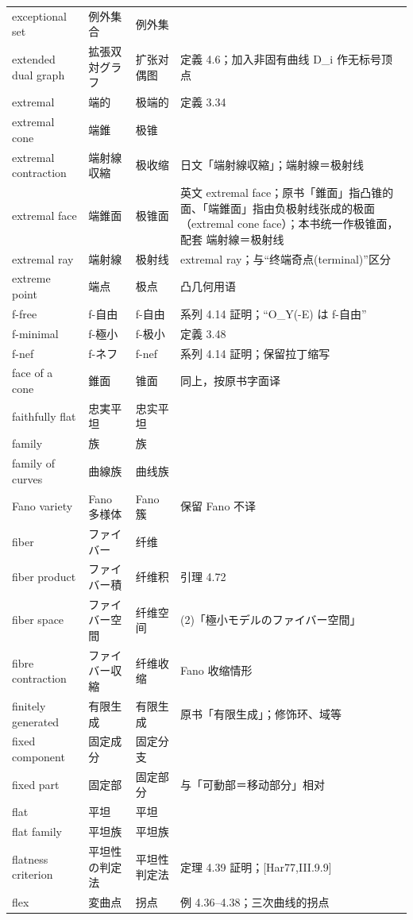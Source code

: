 \begin{longtable}{@{}>{\raggedright\arraybackslash}p{}>{\raggedright\arraybackslash}p{}>{\raggedright\arraybackslash}p{}>{\raggedright\arraybackslash}p{}@{}}
exceptional set & 例外集合 & 例外集 &  \\
extended dual graph & 拡張双対グラフ & 扩张对偶图 & 定義 4.6；加入非固有曲线 D\_i 作无标号顶点 \\
extremal & 端的 & 极端的 & 定義 3.34 \\
extremal cone & 端錐 & 极锥 &  \\
extremal contraction & 端射線収縮 & 极收缩 & 日文「端射線収縮」；端射線＝极射线 \\
extremal face & 端錐面 & 极锥面 & 英文 extremal face；原书「錐面」指凸锥的面、「端錐面」指由负极射线张成的极面（extremal cone face）；本书统一作极锥面，配套 端射線＝极射线 \\
extremal ray & 端射線 & 极射线 & extremal ray；与“终端奇点(terminal)”区分 \\
extreme point & 端点 & 极点 & 凸几何用语 \\
f-free & f-自由 & f-自由 & 系列 4.14 証明；“O\_Y(-E) は f-自由” \\
f-minimal & f-極小 & f-极小 & 定義 3.48 \\
f-nef & f-ネフ & f-nef & 系列 4.14 証明；保留拉丁缩写 \\
face of a cone & 錐面 & 锥面 & 同上，按原书字面译 \\
faithfully flat & 忠実平坦 & 忠实平坦 &  \\
family & 族 & 族 &  \\
family of curves & 曲線族 & 曲线族 &  \\
Fano variety & Fano 多様体 & Fano 簇 & 保留 Fano 不译 \\
fiber & ファイバー & 纤维 &  \\
fiber product & ファイバー積 & 纤维积 & 引理 4.72 \\
fiber space & ファイバー空間 & 纤维空间 & 2.14 (2)「極小モデルのファイバー空間」 \\
fibre contraction & ファイバー収縮 & 纤维收缩 & Fano 收缩情形 \\
finitely generated & 有限生成 & 有限生成 & 原书「有限生成」；修饰环、域等 \\
fixed component & 固定成分 & 固定分支 &  \\
fixed part & 固定部 & 固定部分 & 与「可動部＝移动部分」相对 \\
flat & 平坦 & 平坦 &  \\
flat family & 平坦族 & 平坦族 &  \\
flatness criterion & 平坦性の判定法 & 平坦性判定法 & 定理 4.39 証明；[Har77,III.9.9] \\
flex & 変曲点 & 拐点 & 例 4.36–4.38；三次曲线的拐点 \\

\end{longtable}
